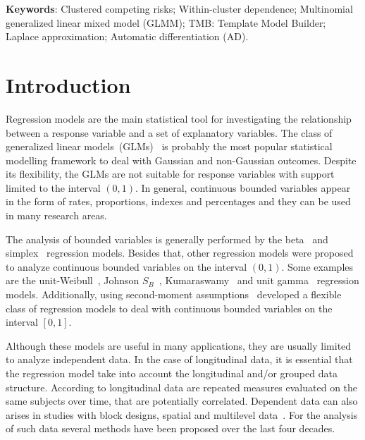 \documentclass[a4paper,12pt]{article}
\begin{document}
\begin{flushleft}
 \textbf{Keywords}: 
 Clustered competing risks;
 Within-cluster dependence;
 Multinomial generalized linear mixed model (GLMM);
 TMB: Template Model Builder;
 Laplace approximation;
 Automatic differentiation (AD).                    
\end{flushleft}

\section{Introduction}

Regression models are the main statistical tool for investigating the
relationship between a response variable and a set of explanatory
variables. The class of generalized linear
models~(GLMs)~\citep{Nelder1972} is probably the most popular
statistical modelling framework to deal with Gaussian and non-Gaussian
outcomes. Despite its flexibility, the GLMs are not suitable for
response variables with support limited to the interval $(0,1)$. In
general, continuous bounded variables appear in the form of rates,
proportions, indexes and percentages and they can be used in many
research areas.

The analysis of bounded variables is generally performed by the
beta~\citep{Ferrari2004} and simplex~\citep{Barndorff:1991} regression
models. Besides that, other regression models were proposed to analyze
continuous bounded variables on the interval $(0,1)$. Some examples are
the unit-Weibull~\citep{mazucheli2019}, Johnson
$S_B$~\citep{lemonte2016new}, Kumaraswamy~\citep{Mitnik:2013} and unit
gamma~\citep{mousa2016gamma} regression models. Additionally, using
second-moment assumptions~\cite{bonatetal2018} developed a flexible
class of regression models to deal with continuous bounded variables on
the interval $[0,1]$.

Although these models are useful in many applications, they are usually
limited to analyze independent data. In the case of longitudinal data,
it is essential that the regression model take into account the
longitudinal and/or grouped data structure. According to
\cite{diggle:2002} longitudinal data are repeated measures evaluated on
the same subjects over time, that are potentially correlated. Dependent
data can also arises in studies with block designs, spatial and
multilevel data~\citep{Verbeke:2001,Fitzmaurice:2008}. For the analysis
of such data several methods have been proposed over the last four
decades.
\end{document}
